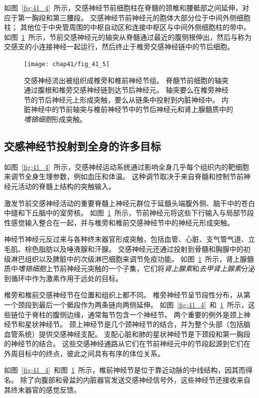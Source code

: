 如图~\ref{fig:41_4}~所示，交感神经节前细胞柱在脊髓的颈椎和腰骶部之间延伸，对应于第一胸段和第三腰段。
交感神经节前神经元的胞体大部分位于中间外侧细胞柱；
其他位于中央管周围的中枢自动区和连接中枢区与中间外侧细胞柱的带中。
如图~\ref{fig:41_5}~所示，节前交感神经元的轴突从脊髓通过最近的腹侧根伸出，然后与称为交感支的小连接神经一起运行，然后终止于椎旁交感神经链中的节后细胞。


\begin{figure}[htbp]
	\centering
	\texttt{[image: chap41/fig\_41\_5]}
	\caption{交感神经流出被组织成椎旁和椎前神经节组。
		脊髓节前细胞的轴突通过腹根和椎旁交感神经链到达节后神经元。
		轴突要么在椎旁神经节的节后神经元上形成突触，要么从链条中投射到内脏神经中。
		内脏神经中的节前轴突与椎前神经节中的节后神经元和肾上腺髓质中的\textit{嗜铬细胞}形成突触。}
	\label{fig:41_5}
\end{figure}


\subsection{交感神经节投射到全身的许多目标}

如图~\ref{fig:41_4}~所示，交感神经运动系统通过影响全身几乎每个组织内的靶细胞来调节全身生理参数，例如血压和体温。
这种调节取决于来自脊髓和控制节前神经元活动的脊髓上结构的突触输入。


激发节前交感神经活动的重要脊髓上神经元群位于延髓头端腹外侧、脑干中的苍白中缝和下丘脑中的室旁核。
如图~\ref{fig:41_5}~所示，节前神经元将这些下行输入与局部节段性感觉输入整合在一起，并与椎旁和椎前交感神经节中的神经元形成突触。


神经节神经元反过来与各种终末器官形成突触，包括血管、心脏、支气管气道、立毛肌、棕色脂肪以及唾液腺和汗腺。
交感神经元还通过投射到骨髓和胸腺中的初级淋巴组织以及脾脏中的次级淋巴细胞来调节免疫功能。
如图~\ref{fig:41_5}~所示，肾上腺髓质中\textit{嗜铬细胞}上节前神经元突触的一个子集，它们将\textit{肾上腺素}和\textit{去甲肾上腺素}分泌到循环中作为激素作用于远处的目标。


椎旁和椎前交感神经节在位置和组织上都不同。
椎旁神经节呈节段性分布，从第一个颈段到最后一个骶段作为两条链向两侧延伸。
如图~\ref{fig:41_4}~和~\ref{fig:41_5}~所示，这些链位于脊柱的腹侧边缘，通常每节包含一个神经节。
两个重要的例外是颈上神经节和星状神经节。
颈上神经节是几个颈神经节的结合，并为整个头部（包括脑血管系统）提供交感神经支配。
支配心脏和肺的星状神经节是下颈段和第一胸段的神经节的结合。
这些交感神经通路从它们在节前神经元中的节段起源到它们在外周目标中的终点，彼此之间具有有序的体位关系。


如图~\ref{fig:41_4}~和图~\ref{fig:41_5}~所示，椎前神经节是位于靠近动脉的中线结构，因其而得名。
除了向腹部和骨盆的内脏器官发送交感神经信号外，这些神经节还接收来自其终末器官的感觉反馈。



